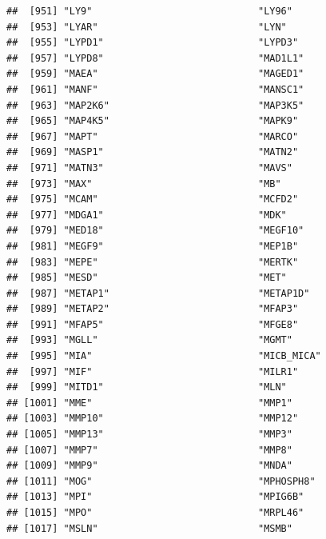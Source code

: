 \documentclass[
]{article}
\begin{document}
\begin{verbatim}
##  [951] "LY9"                             "LY96"                           
##  [953] "LYAR"                            "LYN"                            
##  [955] "LYPD1"                           "LYPD3"                          
##  [957] "LYPD8"                           "MAD1L1"                         
##  [959] "MAEA"                            "MAGED1"                         
##  [961] "MANF"                            "MANSC1"                         
##  [963] "MAP2K6"                          "MAP3K5"                         
##  [965] "MAP4K5"                          "MAPK9"                          
##  [967] "MAPT"                            "MARCO"                          
##  [969] "MASP1"                           "MATN2"                          
##  [971] "MATN3"                           "MAVS"                           
##  [973] "MAX"                             "MB"                             
##  [975] "MCAM"                            "MCFD2"                          
##  [977] "MDGA1"                           "MDK"                            
##  [979] "MED18"                           "MEGF10"                         
##  [981] "MEGF9"                           "MEP1B"                          
##  [983] "MEPE"                            "MERTK"                          
##  [985] "MESD"                            "MET"                            
##  [987] "METAP1"                          "METAP1D"                        
##  [989] "METAP2"                          "MFAP3"                          
##  [991] "MFAP5"                           "MFGE8"                          
##  [993] "MGLL"                            "MGMT"                           
##  [995] "MIA"                             "MICB_MICA"                      
##  [997] "MIF"                             "MILR1"                          
##  [999] "MITD1"                           "MLN"                            
## [1001] "MME"                             "MMP1"                           
## [1003] "MMP10"                           "MMP12"                          
## [1005] "MMP13"                           "MMP3"                           
## [1007] "MMP7"                            "MMP8"                           
## [1009] "MMP9"                            "MNDA"                           
## [1011] "MOG"                             "MPHOSPH8"                       
## [1013] "MPI"                             "MPIG6B"                         
## [1015] "MPO"                             "MRPL46"                         
## [1017] "MSLN"                            "MSMB"                           

\end{verbatim}
\end{document}
